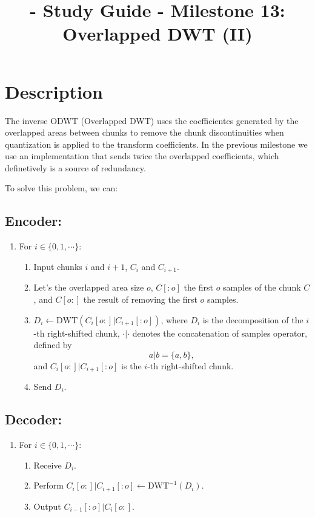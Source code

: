
\title{\TM{} - Study Guide - Milestone 13: Overlapped DWT (II)}

\maketitle

\section{Description}

The inverse ODWT (Overlapped DWT) uses the coefficientes generated by
the overlapped areas between chunks to remove the chunk
discontinuities when quantization is applied to the transform
coefficients. In the previous milestone we use an implementation that
sends twice the overlapped coefficients, which definetively is a
source of redundancy.

To solve this problem, we can:

\subsection*{Encoder:}
\begin{enumerate}
\item For $i\in\{0,1,\cdots\}$:
  \begin{enumerate}
  \item Input chunks $i$ and $i+1$, $C_i$ and $C_{i+1}$.
  \item Let's the overlapped area size $o$, $C[:o]$ the first $o$
    samples of the chunk $C$, and $C[o:]$ the result of removing the
    first $o$ samples.
  \item $D_i \leftarrow \text{DWT}(C_i[o:]|C_{i+1}[:o])$, where $D_i$ is the
    decomposition of the $i$-th right-shifted chunk, $\cdot|\cdot$ denotes
    the concatenation of samples operator, defined by
    \begin{equation}
      a|b = \{a,b\},
    \end{equation}
    and $C_i[o:]|C_{i+1}[:o]$ is the $i$-th right-shifted chunk.
    \item Send $D_i$.
  \end{enumerate}
\end{enumerate}

\subsection*{Decoder:}
\begin{enumerate}
\item For $i\in\{0,1,\cdots\}$:
  \begin{enumerate}
  \item Receive $D_i$.
  \item Perform $C_i[o:]|C_{i+1}[:o]\leftarrow\text{DWT}^{-1}(D_i)$.
  \item Output $C_{i-1}[:o]|C_i[o:]$.
  \end{enumerate}
\end{enumerate}


